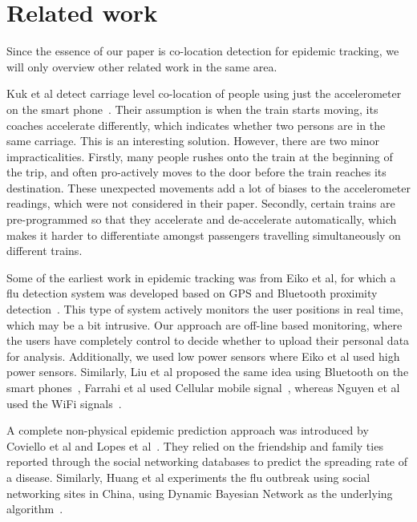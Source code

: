 \documentclass[conference]{IEEEtran}
\begin{document}
\section{Related work}
Since the essence of our paper is co-location detection for epidemic tracking, we will only overview other related work in the same area.

Kuk et al detect carriage level co-location of people using just the accelerometer on the smart phone~\cite{kuk2016car}. Their assumption is when the train starts moving, its coaches accelerate differently, which indicates whether two persons are in the same carriage. This is an interesting solution. However, there are two minor impracticalities. Firstly, many people rushes onto the train at the beginning of the trip, and often pro-actively moves to the door before the train reaches its destination. These unexpected movements add a lot of biases to the accelerometer readings, which were not considered in their paper. Secondly, certain trains are pre-programmed so that they accelerate and de-accelerate automatically, which makes it harder to differentiate amongst passengers travelling simultaneously on different trains.

Some of the earliest work in epidemic tracking was from Eiko et al, for which a flu detection system was developed based on GPS and Bluetooth proximity detection~\cite{yoneki2011fluphone}. This type of system actively monitors the user positions in real time, which may be a bit intrusive. Our approach are off-line based monitoring, where the users have completely control to decide whether to upload their personal data for analysis. Additionally, we used low power sensors where Eiko et al used high power sensors. Similarly, Liu et al proposed the same idea using Bluetooth on the smart phones~\cite{liu2014face}, Farrahi et al used Cellular mobile signal~\cite{farrahi2014epidemic}, whereas Nguyen et al used the WiFi signals~\cite{nguyen2015feasibility}.

A complete non-physical epidemic prediction approach was introduced by Coviello et al and Lopes et al~\cite{coviello2016predicting,lopes2009automated}. They relied on the friendship and family ties reported through the social networking databases to predict the spreading rate of a disease. Similarly, Huang et al experiments the flu outbreak using social networking sites in China, using Dynamic Bayesian Network as the underlying algorithm~\cite{huang2013detecting}.
\end{document}
